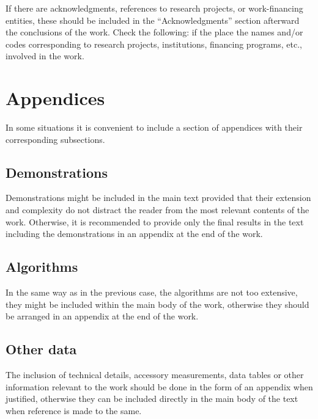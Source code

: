 \documentclass[eng]{ajceam-class}
\begin{document}
If there are acknowledgments, references to research projects, or work-financing entities, these should be included in the ``Acknowledgments'' section afterward the conclusions of the work. Check the following: if the place the names and/or codes corresponding to research projects, institutions, financing programs, etc., involved in the work.

\appendix
\section{Appendices}

In some situations it is convenient to include a section of appendices with their corresponding subsections.

\subsection{Demonstrations}

Demonstrations might be included in the main text provided that their extension and complexity do not distract the reader from the most relevant contents of the work. Otherwise, it is recommended to provide only the final results in the text including the demonstrations in an appendix at the end of the work.

\subsection{Algorithms}

In the same way as in the previous case, the algorithms are not too extensive, they might be included within the main body of the work, otherwise they should be arranged in an appendix at the end of the work.

\subsection{Other data}

The inclusion of technical details, accessory measurements, data tables or other information relevant to the work should be done in the form of an appendix when justified, otherwise they can be included directly in the main body of the text when reference is made to the same.

\end{document}
